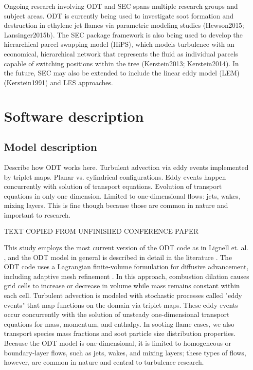 \documentclass[preprint,12pt, a4paper]{elsarticle}
\begin{document}
Ongoing research involving ODT and SEC spans multiple research groups and subject areas. ODT is currently being used to investigate soot formation and destruction in ethylene jet flames via parametric modeling studies (Hewson2015; Lansinger2015b). The SEC package framework is also being used to develop the hierarchical parcel swapping model (HiPS), which models turbulence with an economical, hierarchical network that represents the fluid as individual parcels capable of switching positions within the tree (Kerstein2013; Kerstein2014). In the future, SEC may also be extended to include the linear eddy model (LEM) (Kerstein1991) and LES approaches. 

\section{Software description}
\label{sec:description}

\subsection{Model description}
\label{sub:model_description}

Describe how ODT works here. Turbulent advection via eddy events implemented by triplet maps. Planar vs. cylindrical configurations. Eddy events happen concurrently with solution of transport equations.  Evolution of transport equations in only one dimension. Limited to one-dimensional flows: jets, wakes, mixing layers. This is fine though because those are common in nature and important to research. 

TEXT COPIED FROM UNFINISHED CONFERENCE PAPER

This study employs the most current version of the ODT code as in Lignell et. al. \cite{Lignell_2018}, and the ODT model in general is described in detail in the literature \cite{Lignell_2018,Lignell_2013,Kerstein_1999,Kerstein_2001,Ashurst_2005}. 
The ODT code uses a Lagrangian finite-volume formulation for diffusive advancement, including adaptive mesh refinement \cite{Lignell_2013}. In this approach, combustion dilation causes grid cells to increase or decrease in volume while mass remains constant within each cell. 
Turbulent advection is modeled with stochastic processes called "eddy events" that map functions on the domain via triplet maps. These eddy events occur concurrently with the solution of unsteady one-dimensional transport equations for mass, momentum, and enthalpy. In sooting flame cases, we also transport species mass fractions and soot particle size distribution properties. Because the ODT model is one-dimensional, it is limited to homogeneous or boundary-layer flows, such as jets, wakes, and mixing layers; these types of flows, however, are common in nature and central to turbulence research.
\end{document}

